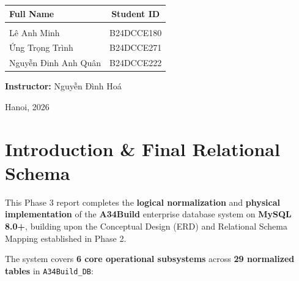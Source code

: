 \documentclass[a4paper,12pt]{report}
\begin{document}
\begin{titlepage}
\begin{center}
{\begin{tabular}{l c}
\textbf{Full Name} & \textbf{Student ID} \\ \hline
\rule{0pt}{0.1cm} \\[-0.4cm]
Lê Anh Minh & B24DCCE180 \\[0.1cm]
Ứng Trọng Trình & B24DCCE271 \\[0.1cm]
Nguyễn Đinh Anh Quân & B24DCCE222 \\[0.1cm]
\end{tabular}
}

\vspace{0.8cm}

{\large\textbf{Instructor:} Nguyễn Đình Hoá}

\vfill

{\large Hanoi, 2026}

\end{center}
\end{titlepage}
\hypersetup{pageanchor=true}

\newpage
\tableofcontents

\newpage
\listoffigures
{}

\chapter{Introduction \& Final Relational Schema}\label{introduction-final-relational-schema}

This Phase 3 report completes the \textbf{logical normalization} and \textbf{physical implementation} of the \textbf{A34Build} enterprise database system on \textbf{MySQL 8.0+}, building upon the Conceptual Design (ERD) and Relational Schema Mapping established in Phase 2.

The system covers \textbf{6 core operational subsystems} across \textbf{29 normalized tables} in \texttt{A34Build\_\allowbreak{}DB}:
\end{document}
